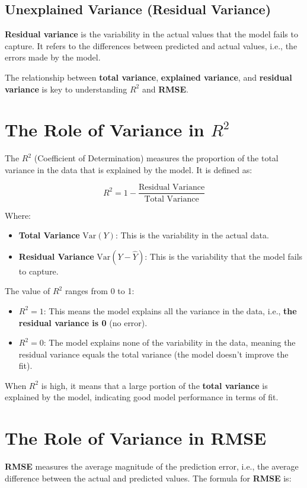 \documentclass{article}
\begin{document}
\subsection{Unexplained Variance (Residual Variance)}
\textbf{Residual variance} is the variability in the actual values that the model fails to capture. It refers to the differences between predicted and actual values, i.e., the errors made by the model.

The relationship between \textbf{total variance}, \textbf{explained variance}, and \textbf{residual variance} is key to understanding \( R^2 \) and \textbf{RMSE}.

\section{The Role of Variance in \( R^2 \)}
The \( R^2 \) (Coefficient of Determination) measures the proportion of the total variance in the data that is explained by the model. It is defined as:

\[
R^2 = 1 - \frac{\text{Residual Variance}}{\text{Total Variance}}
\]

Where:
\begin{itemize}
    \item \textbf{Total Variance} \( \text{Var}(Y) \): This is the variability in the actual data.
    \item \textbf{Residual Variance} \( \text{Var}(Y - \hat{Y}) \): This is the variability that the model fails to capture.
\end{itemize}

The value of \( R^2 \) ranges from 0 to 1:
\begin{itemize}
    \item \( R^2 = 1 \): This means the model explains all the variance in the data, i.e., \textbf{the residual variance is 0} (no error).
    \item \( R^2 = 0 \): The model explains none of the variability in the data, meaning the residual variance equals the total variance (the model doesn't improve the fit).
\end{itemize}

When \( R^2 \) is high, it means that a large portion of the \textbf{total variance} is explained by the model, indicating good model performance in terms of fit.

\section{The Role of Variance in RMSE}
\textbf{RMSE} measures the average magnitude of the prediction error, i.e., the average difference between the actual and predicted values. The formula for \textbf{RMSE} is:
\end{document}
